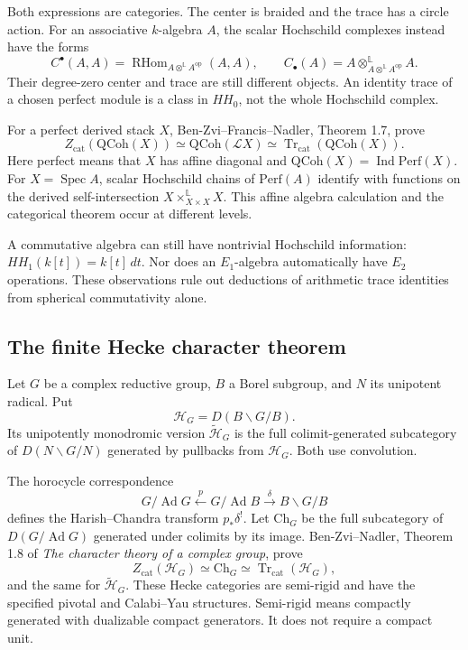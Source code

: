 Both expressions are categories.
The center is braided and the trace has
a circle action.
For an associative \(k\)-algebra \(A\), the scalar Hochschild
complexes instead have the forms
\[
 C^\bullet(A,A)
   =\operatorname{RHom}_{A\otimes^{\mathbb L}A^{\mathrm{op}}}(A,A),
 \qquad
 C_\bullet(A)
   =A\otimes_{A\otimes^{\mathbb L}A^{\mathrm{op}}}^{\mathbb L}A.
\]
Their degree-zero center and trace are still different objects.
An identity trace of a chosen perfect module is a class in
\(HH_0\), not the whole Hochschild complex.

For a perfect derived stack \(X\), Ben-Zvi--Francis--Nadler,
Theorem 1.7, prove
\[
 Z_{\mathrm{cat}}(\mathrm{QCoh}(X))
 \simeq\mathrm{QCoh}(\mathcal LX)
 \simeq\operatorname{Tr}_{\mathrm{cat}}(\mathrm{QCoh}(X)).
\]
Here perfect means that \(X\) has affine diagonal and
\(\mathrm{QCoh}(X)=\operatorname{Ind}\mathrm{Perf}(X)\).
For \(X=\operatorname{Spec}A\), scalar Hochschild chains of
\(\mathrm{Perf}(A)\) identify with functions on the derived
self-intersection
\(X\times_{X\times X}^{\mathbb L}X\).
This affine algebra calculation and the categorical theorem
occur at different levels.

A commutative algebra can still have nontrivial Hochschild
information: \(HH_1(k[t])=k[t]\,dt\).
Nor does an \(E_1\)-algebra automatically have \(E_2\) operations.
These observations rule out deductions of arithmetic trace
identities from spherical commutativity alone.

\subsection{The finite Hecke character theorem}

Let \(G\) be a complex reductive group, \(B\) a Borel subgroup,
and \(N\) its unipotent radical.
Put
\[
 \mathcal H_G=D(B\backslash G/B).
\]
Its unipotently monodromic version
\(\widetilde{\mathcal H}_G\) is the full colimit-generated
subcategory of \(D(N\backslash G/N)\) generated by pullbacks
from \(\mathcal H_G\).
Both use convolution.

The horocycle correspondence
\[
 G/\operatorname{Ad}G
 \xleftarrow{p}G/\operatorname{Ad}B
 \xrightarrow{\delta}B\backslash G/B
\]
defines the Harish--Chandra transform \(p_*\delta^!\).
Let \(\mathrm{Ch}_G\) be the full subcategory of
\(D(G/\operatorname{Ad}G)\) generated under colimits by its image.
Ben-Zvi--Nadler, Theorem 1.8 of
\emph{The character theory of a complex group}, prove
\[
 Z_{\mathrm{cat}}(\mathcal H_G)
 \simeq\mathrm{Ch}_G
 \simeq\operatorname{Tr}_{\mathrm{cat}}(\mathcal H_G),
\]
and the same for \(\widetilde{\mathcal H}_G\).
These Hecke categories are semi-rigid and have the specified
pivotal and Calabi--Yau structures.
Semi-rigid means compactly generated with dualizable compact
generators. It does not require a compact unit.

